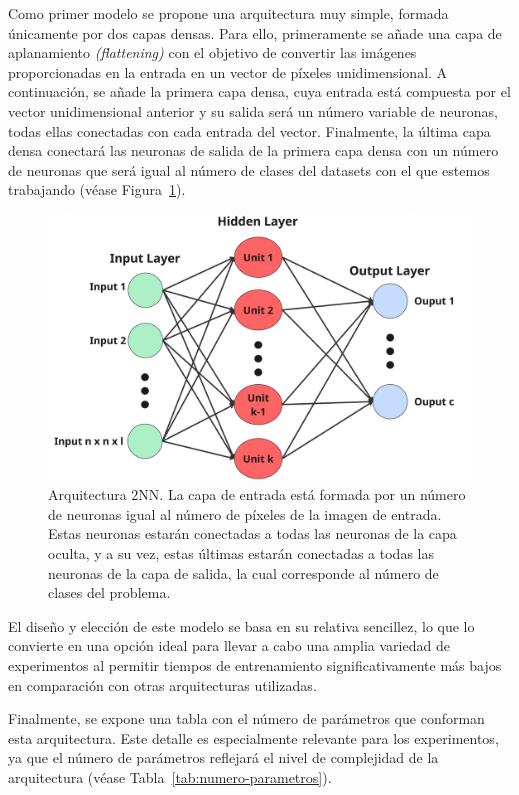 Como primer modelo se propone una arquitectura muy simple, formada únicamente por dos capas densas. Para ello, primeramente se añade una capa de aplanamiento \textit{(flattening)} con el objetivo de convertir las imágenes proporcionadas en la entrada en un vector de píxeles unidimensional. A continuación, se añade la primera capa densa, cuya entrada está compuesta por el vector unidimensional anterior y su salida será un número variable de neuronas, todas ellas conectadas con cada entrada del vector. Finalmente, la última capa densa conectará las neuronas de salida de la primera capa densa con un número de neuronas que será igual al número de clases del datasets con el que estemos trabajando (véase Figura~\ref{fig:arquitecura2nn}).

\begin{figure}[h]
    \centering
    \includegraphics[width=0.6\linewidth]{img/arquitectura2nn.png}
    \caption[Arquitectura $2$NN.]{Arquitectura $2$NN. La capa de entrada está formada por un número de neuronas igual al número de píxeles de la imagen de entrada. Estas neuronas estarán conectadas a todas las neuronas de la capa oculta, y a su vez, estas últimas estarán conectadas a todas las neuronas de la capa de salida, la cual corresponde al número de clases del problema.}\label{fig:arquitecura2nn}
\end{figure}

El diseño y elección de este modelo se basa en su relativa sencillez, lo que lo convierte en una opción ideal para llevar a cabo una amplia variedad de experimentos al permitir tiempos de entrenamiento significativamente más bajos en comparación con otras arquitecturas utilizadas.

Finalmente, se expone una tabla con el número de parámetros que conforman esta arquitectura. Este detalle es especialmente relevante para los experimentos, ya que el número de parámetros reflejará el nivel de complejidad de la arquitectura (véase Tabla~\ref{tab:numero-parametros}).

